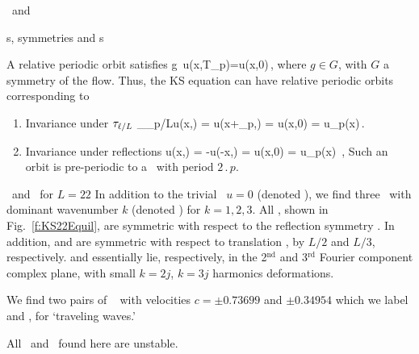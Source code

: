 \documentclass{theo1poster}[2003/04/25]
\begin{document}
\begin{poster}{3}
\begin{sheet}{\Eqva\ and \reqva}
\end{sheet}

\begin{sheet}{\Rpo s, symmetries and \po s} \label{sec:KSePO}

A relative periodic orbit satisfies
\beq
	g\, u(x,T_p)=u(x,0)\,,
\eeq
where $g\in G$, with $G$ a symmetry of the flow.
Thus, the KS equation can have relative periodic orbits corresponding
to 
\begin{enumerate}
 \item Invariance under $\tau_{\ell/L}$
	\beq
		\Shift_{\shift_p/L}u(x,) =
			u(x+\shift_p,) = u(x,0) = u_p(x)\,.
		\label{KSrpos}
	\eeq
 \item Invariance under reflections 
	\beq
		\Refl u(x,) =
			-u(-x,) = u(x,0) = u_p(x)
			\,,
		\label{KSpos}
	\eeq
	Such an orbit is pre-periodic to a \po\ with period $2\period{p}$.
\end{enumerate}

\end{sheet}


\begin{sheet}{\Eqva\ and \reqva\ for $L=22$}
In addition to the trivial \eqv\ $u=0$ (denoted ),
we find three \eqva\ with dominant wavenumber $k$
(denoted ) for $k = 1, 2, 3$.  All {\eqva}, shown in
Fig.~\ref{f:KS22Equil}, are symmetric with respect to the reflection
symmetry .
In addition,  and  are symmetric with respect
to translation , by $L/2$ and $L/3$, respectively.
 and  essentially lie, respectively, in
the 2$^\mathrm{nd}$ and 3$^\mathrm{rd}$ Fourier component complex plane,
with small $k=2j$, $k=3j$ harmonics deformations.

We find two pairs of \reqva\  with velocities
$c =\pm 0.73699$ and $\pm 0.34954$
which we label  and ,
for `traveling waves.' 

All \eqva\ and \reqva\ found here are unstable.


\end{sheet}
\end{poster}
\end{document}
